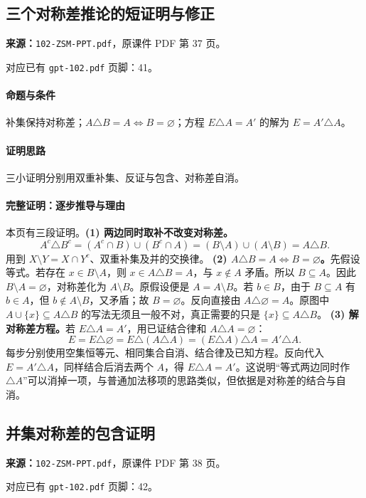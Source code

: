 \clearpage\subsection{三个对称差推论的短证明与修正}
\textbf{来源：}\texttt{102-ZSM-PPT.pdf}，原课件 PDF 第 37 页。\par
对应已有 \texttt{gpt-102.pdf} 页脚：41。\par
\paragraph{命题与条件}补集保持对称差；$A\triangle B=A\iff B=\varnothing$；方程 $E\triangle A=A'$ 的解为 $E=A'\triangle A$。
\paragraph{证明思路}三小证明分别用双重补集、反证与包含、对称差自消。
\paragraph{完整证明：逐步推导与理由}
本页有三段证明。\textbf{(1) 两边同时取补不改变对称差。}
\[A^c\triangle B^c=(A^c\cap B)\cup(B^c\cap A)=(B\setminus A)\cup(A\setminus B)=A\triangle B.\]
用到 $X\setminus Y=X\cap Y^c$、双重补集及并的交换律。
\textbf{(2) $A\triangle B=A\iff B=\varnothing$。}先假设等式。若存在 $x\in B\setminus A$，则 $x\in A\triangle B=A$，与 $x\notin A$ 矛盾。所以 $B\subseteq A$。因此 $B\setminus A=\varnothing$，对称差化为 $A\setminus B$。原假设便是 $A=A\setminus B$。若 $b\in B$，由于 $B\subseteq A$ 有 $b\in A$，但 $b\notin A\setminus B$，又矛盾；故 $B=\varnothing$。反向直接由 $A\triangle\varnothing=A$。原图中 $A\cup\{x\}\subseteq A\triangle B$ 的写法无须且一般不对，真正需要的只是 $\{x\}\subseteq A\triangle B$。
\textbf{(3) 解对称差方程。}若 $E\triangle A=A'$，用已证结合律和 $A\triangle A=\varnothing$：
\[E=E\triangle\varnothing=E\triangle(A\triangle A)=(E\triangle A)\triangle A=A'\triangle A.\]
每步分别使用空集恒等元、相同集合自消、结合律及已知方程。反向代入 $E=A'\triangle A$，同样结合后消去两个 $A$，得 $E\triangle A=A'$。这说明“等式两边同时作 $\triangle A$”可以消掉一项，与普通加法移项的思路类似，但依据是对称差的结合与自消。
\clearpage\subsection{并集对称差的包含证明}
\textbf{来源：}\texttt{102-ZSM-PPT.pdf}，原课件 PDF 第 38 页。\par
对应已有 \texttt{gpt-102.pdf} 页脚：42。\par
